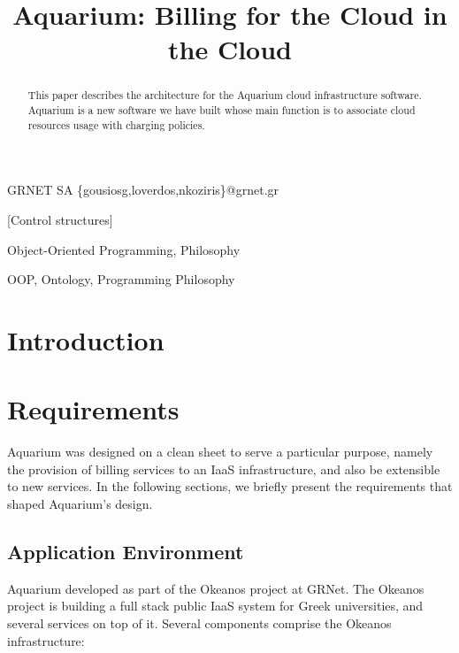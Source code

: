 \documentclass[preprint,10pt]{sigplanconf}
\begin{document}




\title{Aquarium: Billing for the Cloud in the Cloud}

{GRNET SA}
{\{gousiosg,loverdos,nkoziris\}@grnet.gr}

\maketitle
\begin{abstract}
    This paper describes the architecture for the Aquarium cloud infrastructure
    software. Aquarium is a new software we have built whose main function is to associate cloud resources usage with charging policies.
\end{abstract}

[Control structures]

\terms
    Object-Oriented Programming, Philosophy

\keywords
    OOP, Ontology, Programming Philosophy

\section{Introduction}
\section{Requirements}

Aquarium was designed on a clean sheet to serve a particular purpose,
namely the provision of billing services to an IaaS infrastructure,
and also be extensible to new services. In the following sections,
we briefly present the requirements that shaped Aquarium's design.

\subsection{Application Environment}
Aquarium developed as part of the Okeanos project at GRNet. The
Okeanos project is building a full stack public IaaS system for Greek
universities, and several services on top of it. Several components comprise
the Okeanos infrastructure:
\end{document}
